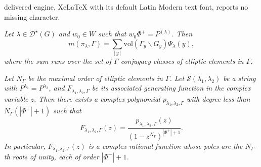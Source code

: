 \documentclass[10pt,a4paper]{amsart}
\begin{document}
delivered engine, XeLaTeX with its default Latin Modern text font, reports no missing character.
\begin{theorem}\label{thm6}
\textit{Let $\lambda \in \mathcal{D}^{\star}(G)$ and $w_0 \in W$ such that $w_0 \Phi^+=P^{(\lambda)}$. Then $$m(\pi_{\lambda}, \Gamma) =\sum\limits_{[y]} \text{vol}(\Gamma_y \backslash G_y) \Psi_{\lambda}(y),$$ where the sum runs over the set of $\Gamma$-conjugacy classes of elliptic elements in $\Gamma$.}
\end{theorem}

\begin{proposition}\label{propgen}
\textit{Let $N_{\Gamma}$ be the maximal order of elliptic elements in $\Gamma$. Let $\mathcal{S}(\lambda_1, \lambda_2)$ be a string with $P^{\lambda_1}=P^{\lambda_2}$, and $F_{\lambda_1, \lambda_2, \Gamma}$ be its associated generating function in the complex variable $z$. Then there exists a complex polynomial $p_{\lambda_1, \lambda_2, \Gamma}$ with degree less than $N_{\Gamma} ( |\Phi^+| +1)$ such that 
$$ F_{\lambda_1, \lambda_2, \Gamma}(z) = \frac{p_{\lambda_1, \lambda_2, \Gamma}(z)}{(1 -z^{N_{\Gamma}})^{|\Phi^+| +1}}.$$ 
In particular, $F_{\lambda_1, \lambda_2, \Gamma}(z)$ is a complex rational function whose poles are the $N_{\Gamma}$-th roots of unity, each of order $|\Phi^+| +1$.} 
\end{proposition}
\end{document}
